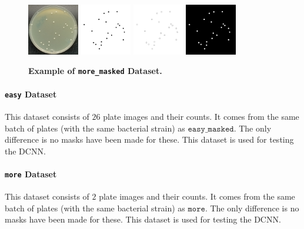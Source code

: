 \documentclass[10pt,letterpaper]{article}
\begin{document}
            \begin{figure}[h]
                \graphicspath{{results/preprocess_masked/figures/original/}}
                \includegraphics[width=0.2\textwidth]{more_0_image}
                \includegraphics[width=0.2\textwidth]{more_0_inside}
                \includegraphics[width=0.2\textwidth]{more_0_edge}
                \includegraphics[width=0.2\textwidth]{more_0_outside}
                \caption{{\bf Example of \texttt{more\_masked} Dataset.}}
                \label{more-masked}
            \end{figure}

        \paragraph*{\texttt{easy} Dataset}
            This dataset consists of $26$ plate images and their counts. It comes from the same batch of plates (with the same bacterial strain) as $\texttt{easy\_masked}$. The only difference is no masks have been made for these. This dataset is used for testing the DCNN.
            
        \paragraph*{\texttt{more} Dataset}
            This dataset consists of $2$ plate images and their counts. It comes from the same batch of plates (with the same bacterial strain) as $\texttt{more}$. The only difference is no masks have been made for these. This dataset is used for testing the DCNN.
\end{document}
